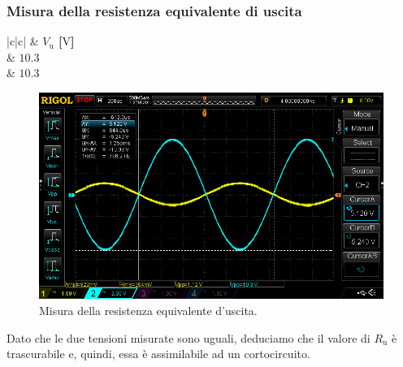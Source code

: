 \documentclass[a4paper]{article}
\begin{document}
			\subsubsection{Misura della resistenza equivalente di uscita}	
				\begin{center}
					\begin{tabular}{ |c|c| }
						\hline
						\multirow{} 				   		  & \textbf{$ V_{\mathrm{u}} $ [$ \mathrm{V} $]} \\
						\hline
						 		  & $ 10.3 $ \\
						 & $ 10.3 $ \\
						\hline
					\end{tabular}
				\end{center}
				\begin{figure}[h!]
					\centering
					\includegraphics[scale=0.2]{misuraDellaResistenzaEquivalenteInIngressoAmplificatoreInvertenteR9InCorto}
					\caption{Misura della resistenza equivalente d'uscita.}
					\label{fig:misuraDellaResistenzaEquivalenteDiUscitaAmplificatoreInvertente}
				\end{figure}
				\newpage
				Dato che le due tensioni misurate sono uguali, deduciamo che il valore di $ R_{\mathrm{u}} $ è trascurabile e, quindi, essa è assimilabile ad un cortocircuito.
\end{document}
